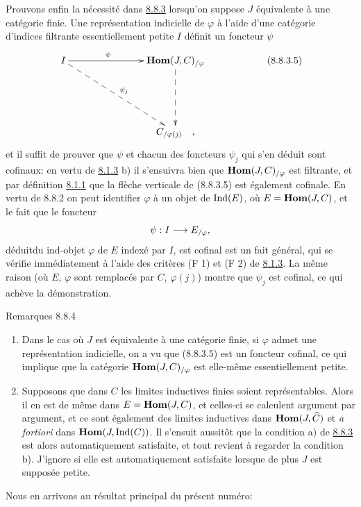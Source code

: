 \documentclass[10pt]{../fichiers-configuration-latex/smfart}
\def\labelenumi{(\theenumi)}
\begin{document}
Prouvons enfin la nécessité dans \hyperref[I.prop8.8.3]{8.8.3} lorsqu'on suppose
$J$ équivalente à une catégorie finie. Une représentation indicielle
de $\varphi$ à l'aide d'une catégorie d'indices filtrante
essentiellement petite $I$ définit un foncteur $\psi$
\[
\xymatrix@C=1.25cm@R=2cm{
 I \ar[rr]^(.4){\psi} \ar@{-->}[rrd]^{\psi_j}&&  \Hhom(J,C)_{/\varphi} \ar@{-->}[d] &\\
                        &     &   C_{/\varphi(j)}\quad ,\\
}\tag{8.8.3.5}
\]
et il suffit de prouver que $\psi$ et chacun des foncteurs $\psi_j$
qui s'en déduit sont cofinaux: en vertu de \hyperref[I.prop8.1.3]{8.1.3} b) il
s'ensuivra bien que $\operatorname{\mathbf{Hom}}(J,C)_{/\varphi}$ est filtrante, et par
définition \hyperref[I.def8.1.1]{8.1.1} que la flèche verticale de (8.8.3.5) est
également cofinale. En vertu de 8.8.2 on peut identifier $\varphi$ à
un objet de $\operatorname{Ind}(E)$, où $E=\operatorname{\mathbf{Hom}}(J,C)$, et le fait que le foncteur
$$
\psi:I\longrightarrow E_{/\varphi}{},
$$
déduit\pageoriginale du ind-objet $\varphi$ de $E$ indexé par $I$,
est cofinal est un fait général, qui se vérifie immédiatement à
l'aide des critères (F 1) et (F 2) de \hyperref[I.prop8.1.3]{8.1.3}. La même
raison (où $E$, $\varphi$ sont remplacés par $C$, $\varphi(j)$)
montre que $\psi_j$ est cofinal, ce qui achève la démonstration.

\begin{enonce*}[remark]{Remarques 8.8.4}
\begin{enumerate}
\renewcommand{\theenumi}{\alph{enumi}}
\renewcommand{\labelenumi}{\theenumi)}
\item Dans le cas où $J$ est équivalente à une catégorie
finie, si $\varphi$ admet une représentation indicielle, on a vu que
(8.8.3.5) est un foncteur cofinal, ce qui implique que la catégorie
$\operatorname{\mathbf{Hom}}(J,C)_{/\varphi}$ est elle-même essentiellement petite.

\item Supposons que dans $C$ les limites inductives finies soient
représentables. Alors il en est de même dans $E=\operatorname{\mathbf{Hom}}(J,C)$, et
celles-ci se calculent argument par argument, et ce sont également
des limites inductives dans $\operatorname{\mathbf{Hom}}(J,\widehat{C})$ et \textit{a
fortiori} dans $\operatorname{\mathbf{Hom}}(J,\operatorname{Ind}(C))$. Il s'ensuit aussitôt que la
condition a) de \hyperref[I.prop8.8.3]{8.8.3} est alors automatiquement
satisfaite, et tout revient à regarder la condition b). J'ignore si
elle est automatiquement satisfaite lorsque de plus $J$ est supposée
petite.
\end{enumerate}
\end{enonce*}
Nous en arrivons au résultat principal du présent numéro:
\end{document}
